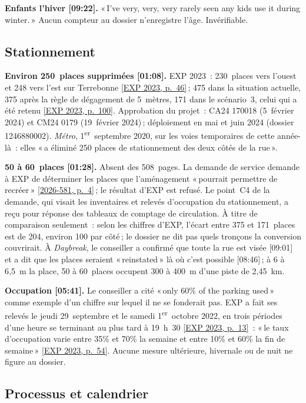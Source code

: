 \documentclass[11pt,letterpaper]{article}
\newcommand{\repourl}{https://github.com/OpenMobilityData/Terrebonne-open-sources}
\newcommand{\pagesurl}{https://openmobilitydata.github.io/Terrebonne-access-requests}
\newcommand{\cliptime}[1]{\textsf{\small[#1]}}
\newcommand{\pgl}[2]{\href{\pagesurl/2026-581/raw/01_emails_mandate_counts.pdf\#page=#1}{\textsf{\small[2026-581, p.~#2]}}}
\newcommand{\pg}[1]{\pgl{#1}{#1}}
\newcommand{\exppg}[1]{\href{\repourl/blob/main/2023-exp-mobility-study/raw/EXP_Etude_de_mobilite_rue_de_Terrebonne_2023.pdf}{\textsf{\small[EXP 2023, p.~#1]}}}
\begin{document}
\textbf{Enfants l'hiver \cliptime{09:22}.} «\,I've very, very, very rarely
seen any kids use it during winter.\,» Aucun compteur au dossier
n'enregistre l'âge. Invérifiable.

\subsection{Stationnement}

\textbf{Environ 250~places supprimées \cliptime{01:08}.} EXP 2023~:
230~places vers l'ouest et 248 vers l'est sur Terrebonne \exppg{46}\,; 475
dans la situation actuelle, 375 après la règle de dégagement de 5~mètres,
171 dans le scénario~3, celui qui a été retenu \exppg{100}. Approbation du
projet~: CA24 170018 (5~février 2024) et CM24 0179 (19~février 2024)\,;
déploiement en mai et juin 2024 (dossier 1246880002). \emph{Métro},
1\textsuperscript{er}~septembre 2020, sur les voies temporaires de cette
année-là~: elles «\,a éliminé 250 places de stationnement des deux côtés de
la rue\,».

\textbf{50 à 60~places \cliptime{01:28}.} Absent des 508~pages. La demande
de service demande à EXP de déterminer les places que l'aménagement
«\,pourrait permettre de recréer\,» \pg{4}\,; le résultat d'EXP est refusé.
Le point~C4 de la demande, qui visait les inventaires et relevés
d'occupation du stationnement, a reçu pour réponse des tableaux de
comptage de circulation. À titre de comparaison seulement~: selon les
chiffres d'EXP, l'écart entre 375 et 171~places est de 204, environ 100 par
côté\,; le dossier ne dit pas quels tronçons la conversion couvrirait. À
\emph{Daybreak}, le conseiller a confirmé que toute la rue est visée
\cliptime{09:01} et a dit que les places seraient «\,reinstated\,» là où
c'est possible \cliptime{08:46}\,; à 6 à 6{,}5~m la place, 50 à 60~places
occupent 300 à 400~m d'une piste de 2{,}45~km.

\textbf{Occupation \cliptime{05:41}.} Le conseiller a cité «\,only 60\% of
the parking used\,» comme exemple d'un chiffre sur lequel il ne se fonderait
pas. EXP a fait ses relevés le jeudi 29~septembre et le samedi
1\textsuperscript{er}~octobre 2022, en trois périodes d'une heure se
terminant au plus tard à 19~h~30 \exppg{13}~: «\,le taux d'occupation varie
entre 35\% et 70\% la semaine et entre 10\% et 60\% la fin de semaine\,»
\exppg{54}. Aucune mesure ultérieure, hivernale ou de nuit ne figure au
dossier.

\subsection{Processus et calendrier}
\end{document}

